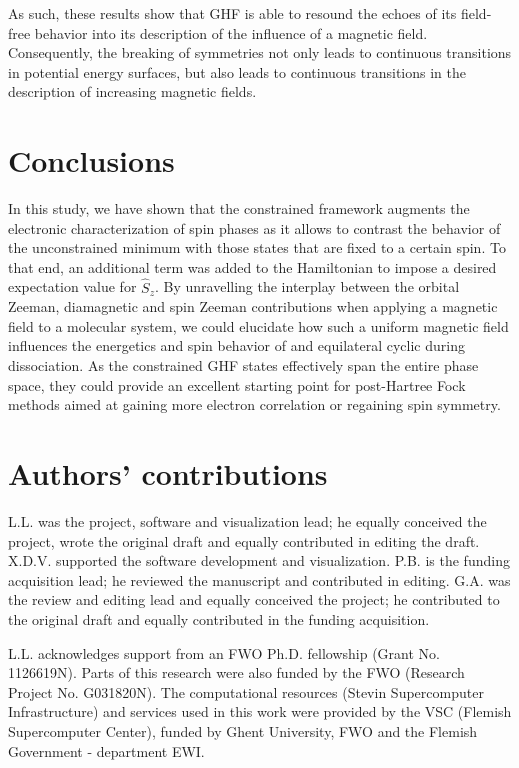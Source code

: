 \documentclass[journal=jctc,manuscript=article]{achemso}
\begin{document}
        As such, these results show that GHF is able to resound the echoes of its field-free behavior into its description of the influence of a magnetic field. Consequently, the breaking of symmetries not only leads to continuous transitions in potential energy surfaces, but also leads to continuous transitions in the description of increasing magnetic fields.

\section{Conclusions}
    In this study, we have shown that the constrained framework augments the electronic characterization of spin phases as it allows to contrast the behavior of the unconstrained minimum with those states that are fixed to a certain spin. To that end, an additional term was added to the Hamiltonian to impose a desired expectation value for $\hat{S}_z$.
    By unravelling the interplay between the orbital Zeeman, diamagnetic and spin Zeeman contributions when applying a magnetic field to a molecular system, we could elucidate how such a uniform magnetic field influences the energetics and spin behavior of  and equilateral cyclic  during dissociation.
    As the constrained GHF states effectively span the entire phase space, they could provide an excellent starting point for post-Hartree Fock methods aimed at gaining more electron correlation or regaining spin symmetry.

\section*{Authors' contributions}
    L.L. was the project, software and visualization lead; he equally conceived the project, wrote the original draft and equally contributed in editing the draft.
    X.D.V. supported the software development and visualization.
    P.B. is the funding acquisition lead; he reviewed the manuscript and contributed in editing.
    G.A. was the review and editing lead and equally conceived the project; he contributed to the original draft and equally contributed in the funding acquisition.



\begin{acknowledgement}
    L.L. acknowledges support from an FWO Ph.D. fellowship (Grant No. 1126619N).
    Parts of this research were also funded by the FWO (Research Project No. G031820N).
    The computational resources (Stevin Supercomputer Infrastructure) and services used in this work were provided by the VSC (Flemish Supercomputer Center), funded by Ghent University, FWO and the Flemish Government - department EWI.
\end{acknowledgement}
\end{document}
